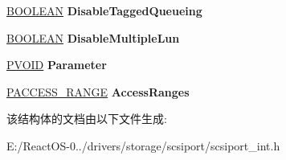 \begin{DoxyCompactItemize}
\hyperlink{_processor_bind_8h_a112e3146cb38b6ee95e64d85842e380a}{B\+O\+O\+L\+E\+AN} {\bfseries Disable\+Tagged\+Queueing}
\item 
\mbox{\label{struct___c_o_n_f_i_g_u_r_a_t_i_o_n___i_n_f_o_ae6e8bf0f03a23771a448ae83a7ea9e1f}} 
\hyperlink{_processor_bind_8h_a112e3146cb38b6ee95e64d85842e380a}{B\+O\+O\+L\+E\+AN} {\bfseries Disable\+Multiple\+Lun}
\item 
\mbox{\label{struct___c_o_n_f_i_g_u_r_a_t_i_o_n___i_n_f_o_adedae23458c9884d8c889b1508642c66}} 
\hyperlink{interfacevoid}{P\+V\+O\+ID} {\bfseries Parameter}
\item 
\mbox{\label{struct___c_o_n_f_i_g_u_r_a_t_i_o_n___i_n_f_o_ade75f35edac41ed75665477f0f5e8cb3}} 
\hyperlink{struct___a_c_c_e_s_s___r_a_n_g_e}{P\+A\+C\+C\+E\+S\+S\+\_\+\+R\+A\+N\+GE} {\bfseries Access\+Ranges}
\end{DoxyCompactItemize}


该结构体的文档由以下文件生成\+:\begin{DoxyCompactItemize}
\item 
E\+:/\+React\+O\+S-\/0../drivers/storage/scsiport/scsiport\+\_\+int.\+h\end{DoxyCompactItemize}
